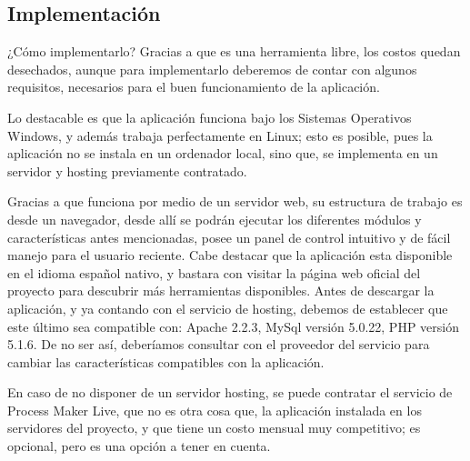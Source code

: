 \subsection{Implementación}

¿Cómo implementarlo? Gracias a que es una herramienta libre, los costos quedan desechados, aunque para implementarlo deberemos de contar con algunos requisitos, necesarios para el buen funcionamiento de la aplicación.

Lo destacable es que la aplicación funciona bajo los Sistemas Operativos Windows, y además trabaja perfectamente en Linux; esto es posible, pues la aplicación no se instala en un ordenador local, sino que, se implementa en un servidor y hosting previamente contratado.

Gracias a que funciona por medio de un servidor web, su estructura de trabajo es desde un navegador, desde allí se podrán ejecutar los diferentes módulos y características antes mencionadas, posee un panel de control intuitivo y de fácil manejo para el usuario reciente. Cabe destacar que la aplicación esta disponible en el idioma español nativo, y bastara con visitar la página web oficial del proyecto para descubrir más herramientas disponibles.
Antes de descargar la aplicación, y ya contando con el servicio de hosting, debemos de establecer que este último sea compatible con: Apache 2.2.3, MySql versión 5.0.22, PHP versión 5.1.6. De no ser así, deberíamos consultar con el proveedor del servicio para cambiar las características compatibles con la aplicación.

En caso de no disponer de un servidor hosting, se puede contratar el servicio de Process Maker Live, que no es otra cosa que, la aplicación instalada en los servidores del proyecto, y que tiene un costo mensual muy competitivo; es opcional, pero es una opción a tener en cuenta.







